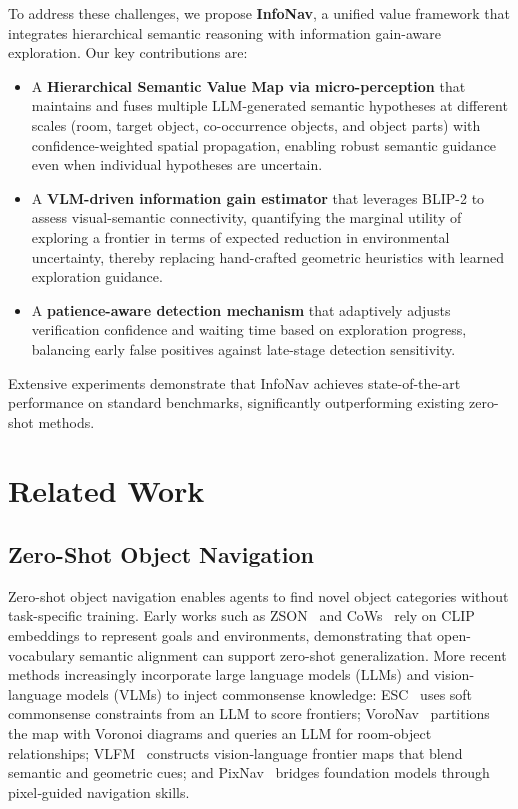\documentclass[conference]{IEEEtran}
\begin{document}
To address these challenges, we propose \textbf{InfoNav}, a unified value framework that integrates hierarchical semantic reasoning with information gain-aware exploration. Our key contributions are:

\begin{itemize}
    \item A \textbf{Hierarchical Semantic Value Map via micro-perception} that maintains and fuses multiple LLM-generated semantic hypotheses at different scales (room, target object, co-occurrence objects, and object parts) with confidence-weighted spatial propagation, enabling robust semantic guidance even when individual hypotheses are uncertain.
    
    \item A \textbf{VLM-driven information gain estimator} that leverages BLIP-2 to assess visual-semantic connectivity, quantifying the marginal utility of exploring a frontier in terms of expected reduction in environmental uncertainty, thereby replacing hand-crafted geometric heuristics with learned exploration guidance.
    
    \item A \textbf{patience-aware detection mechanism} that adaptively adjusts verification confidence and waiting time based on exploration progress, balancing early false positives against late-stage detection sensitivity.
\end{itemize}

Extensive experiments demonstrate that InfoNav achieves state-of-the-art performance on standard benchmarks, significantly outperforming existing zero-shot methods.
\section{Related Work}
\label{sec:related_work}

\subsection{Zero-Shot Object Navigation}

Zero-shot object navigation enables agents to find novel object categories without task-specific training. Early works such as ZSON~\cite{majumdar2022zson} and CoWs~\cite{gadre2023cows} rely on CLIP embeddings to represent goals and environments, demonstrating that open-vocabulary semantic alignment can support zero-shot generalization. More recent methods increasingly incorporate large language models (LLMs) and vision-language models (VLMs) to inject commonsense knowledge: ESC~\cite{zhou2023esc} uses soft commonsense constraints from an LLM to score frontiers; VoroNav~\cite{wu2024voronav} partitions the map with Voronoi diagrams and queries an LLM for room‑object relationships; VLFM~\cite{yokoyama2024vlfm} constructs vision‑language frontier maps that blend semantic and geometric cues; and PixNav~\cite{cai2024pixnav} bridges foundation models through pixel‑guided navigation skills.
\end{document}
